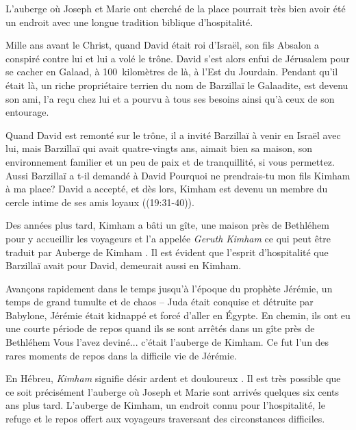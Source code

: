 

L'auberge où Joseph et Marie ont cherché de la place pourrait très bien avoir été un endroit avec une longue tradition biblique d'hospitalité.

Mille ans avant le Christ, quand David était roi d'Israël, son fils Absalon a conspiré contre lui et lui a volé le trône. David s'est alors enfui de Jérusalem pour se cacher en Galaad, à 100~kilomètres de là, à l'Est du Jourdain. Pendant qu'il était là, un riche propriétaire terrien du nom de Barzillaï le Galaadite, est devenu son ami, l'a reçu chez lui et a pourvu à tous ses besoins ainsi qu'à ceux de son entourage.

Quand David est remonté sur le trône, il a invité Barzillaï à venir en Israël avec lui, mais Barzillaï qui avait quatre-vingts ans, aimait bien sa maison, son environnement familier \Og et un peu de paix et de tranquillité, si vous permettez. \Fg{} Aussi Barzillaï a t-il demandé à David\frcolon{} \Og Pourquoi ne prendrais-tu mon fils Kimham à ma place? \Fg{} David a accepté, et dès lors, Kimham est devenu un membre du cercle intime de ses amis loyaux ((19:31-40)).

Des années plus tard, Kimham a bâti un gîte, une maison près de Bethléhem pour y accueillir les voyageurs et l'a appelée \emph{Geruth Kimham} ce qui peut être traduit par \Og Auberge de Kimham \Fg{}. Il est évident que l'esprit d'hospitalité que Barzillaï avait pour David, demeurait aussi en Kimham.

Avançons rapidement dans le temps jusqu'à l'époque du prophète Jérémie, un temps de grand tumulte et de chaos – Juda était conquise et détruite par Babylone, Jérémie était kidnappé et forcé d'aller en Égypte. En chemin, ils ont eu une courte période de repos quand ils se sont arrêtés dans un gîte près de Bethléhem Vous l'avez deviné... c'était l'auberge de Kimham. Ce fut l'un des rares moments de repos dans la difficile vie de Jérémie.

En Hébreu, \emph{Kimham} signifie \Og désir ardent et douloureux \Fg{}. Il est très possible que ce soit précisément l'auberge où Joseph et Marie sont arrivés quelques six cents ans plus tard. L'auberge de Kimham, un endroit connu pour l'hospitalité, le refuge et le repos offert aux voyageurs traversant des circonstances difficiles.

